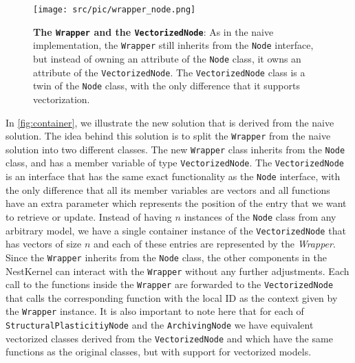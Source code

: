\begin{figure}[h!]
\centering
\texttt{[image: src/pic/wrapper\_node.png]}
\caption{\textbf{The \texttt{Wrapper} and the \texttt{VectorizedNode}}: As in the naive implementation, the \texttt{Wrapper} still inherits from the \texttt{Node} interface, but instead of owning an attribute of the \texttt{Node} class, it owns an attribute of the \texttt{VectorizedNode}. The \texttt{VectorizedNode} class is a twin of the \texttt{Node} class, with the only difference that it supports vectorization.}
\label{fig:container}
\end{figure}

In \autoref{fig:container}, we illustrate the new solution that is derived from the naive solution. The idea behind this solution is to split the \texttt{Wrapper} from the naive solution into two different classes. The new \texttt{Wrapper} class inherits from the \texttt{Node} class, and has a member variable of type \texttt{VectorizedNode}. The \texttt{VectorizedNode} is an interface that has the same exact functionality as the \texttt{Node} interface, with the only difference that all its member variables are vectors and all functions have an extra parameter which represents the position of the entry that we want to retrieve or update. Instead of having $n$ instances of the \texttt{Node} class from any arbitrary model, we have a single container instance of the \texttt{VectorizedNode} that has vectors of size $n$ and each of these entries are represented by the \emph{Wrapper}. Since the \texttt{Wrapper} inherits from the \texttt{Node} class, the other components in the NestKernel can interact with the \texttt{Wrapper} without any further adjustments. Each call to the functions inside the \texttt{Wrapper} are forwarded to the \texttt{VectorizedNode} that calls the corresponding function with the local ID as the context given by the \texttt{Wrapper} instance. It is also important to note here that for each of \texttt{StructuralPlasticitiyNode} and the \texttt{ArchivingNode} we have equivalent vectorized classes derived from the \texttt{VectorizedNode} and which have the same functions as the original classes, but with support for vectorized models.

